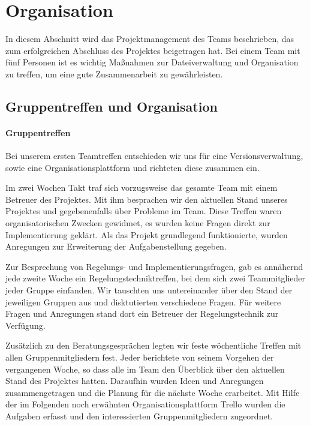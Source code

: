 \section{Organisation}
\label{cha:Organisation}
In diesem Abschnitt wird das Projektmanagement des Teams beschrieben, das zum erfolgreichen Abschluss des Projektes beigetragen hat. Bei einem Team mit fünf Personen ist es wichtig Maßnahmen zur Dateiverwaltung und Organisation zu treffen, um eine gute Zusammenarbeit zu gewährleisten.

\subsection{Gruppentreffen und Organisation}
\label{sec:gruppentreffenundorganisation}
\paragraph{Gruppentreffen}
Bei unserem ersten Teamtreffen entschieden wir uns für eine Versionsverwaltung, sowie eine Organisationsplattform und richteten diese zusammen ein.

Im zwei Wochen Takt traf sich vorzugsweise das gesamte Team mit einem Betreuer des Projektes. Mit ihm besprachen wir den aktuellen Stand unseres Projektes und gegebenenfalls über Probleme im Team. Diese Treffen waren organisatorischen Zwecken gewidmet, es wurden keine Fragen direkt zur Implementierung geklärt. Als das Projekt grundlegend funktionierte, wurden Anregungen zur Erweiterung der Aufgabenstellung gegeben. 

Zur Besprechung von Regelungs- und Implementierungsfragen, gab es annähernd jede zweite Woche ein Regelungstechniktreffen, bei dem sich zwei Teammitglieder jeder Gruppe einfanden. Wir tauschten uns untereinander über den Stand der jeweiligen Gruppen aus und disktutierten verschiedene Fragen. Für weitere Fragen und Anregungen stand dort ein Betreuer der Regelungstechnik zur Verfügung.

Zusätzlich zu den Beratungsgesprächen legten wir feste wöchentliche Treffen mit allen Gruppenmitgliedern fest. Jeder berichtete von seinem Vorgehen der vergangenen Woche, so dass alle im Team den Überblick über den aktuellen Stand des Projektes hatten. Daraufhin wurden Ideen und Anregungen zusammengetragen und die Planung für die nächste Woche erarbeitet. Mit Hilfe der im Folgenden noch erwähnten Organisationsplattform Trello wurden die Aufgaben erfasst und den interessierten Gruppenmitgliedern zugeordnet. 

